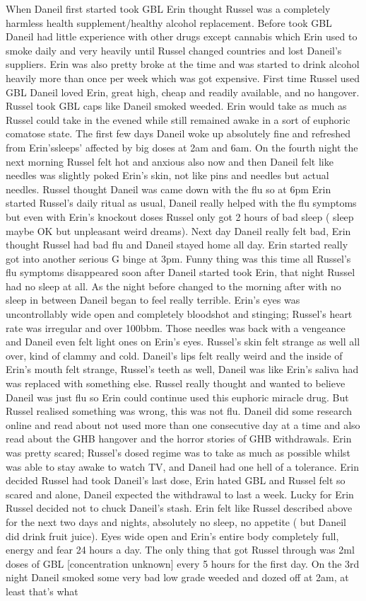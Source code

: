 \documentclass[12pt]{book}
\begin{document}
When Daneil first started took GBL Erin thought Russel was a completely harmless health supplement/healthy alcohol replacement. Before took GBL Daneil had little experience with other drugs except cannabis which Erin used to smoke daily and very heavily until Russel changed countries and lost Daneil's suppliers. Erin was also pretty broke at the time and was started to drink alcohol heavily more than once per week which was got expensive. First time Russel used GBL Daneil loved Erin, great high, cheap and readily available, and no hangover. Russel took GBL caps like Daneil smoked weeded. Erin would take as much as Russel could take in the evened while still remained awake in a sort of euphoric comatose state. The first few days Daneil woke up absolutely fine and refreshed from Erin'ssleeps' affected by big doses at 2am and 6am. On the fourth night the next morning Russel felt hot and anxious also now and then Daneil felt like needles was slightly poked Erin's skin, not like pins and needles but actual needles. Russel thought Daneil was came down with the flu so at 6pm Erin started Russel's daily ritual as usual, Daneil really helped with the flu symptoms but even with Erin's knockout doses Russel only got 2 hours of bad sleep ( sleep maybe OK but unpleasant weird dreams). Next day Daneil really felt bad, Erin thought Russel had bad flu and Daneil stayed home all day. Erin started really got into another serious G binge at 3pm. Funny thing was this time all Russel's flu symptoms disappeared soon after Daneil started took Erin, that night Russel had no sleep at all. As the night before changed to the morning after with no sleep in between Daneil began to feel really terrible. Erin's eyes was uncontrollably wide open and completely bloodshot and stinging; Russel's heart rate was irregular and over 100bbm. Those needles was back with a vengeance and Daneil even felt light ones on Erin's eyes. Russel's skin felt strange as well all over, kind of clammy and cold. Daneil's lips felt really weird and the inside of Erin's mouth felt strange, Russel's teeth as well, Daneil was like Erin's saliva had was replaced with something else. Russel really thought and wanted to believe Daneil was just flu so Erin could continue used this euphoric miracle drug. But Russel realised something was wrong, this was not flu. Daneil did some research online and read about not used more than one consecutive day at a time and also read about the GHB hangover and the horror stories of GHB withdrawals. Erin was pretty scared; Russel's dosed regime was to take as much as possible whilst was able to stay awake to watch TV, and Daneil had one hell of a tolerance. Erin decided Russel had took Daneil's last dose, Erin hated GBL and Russel felt so scared and alone, Daneil expected the withdrawal to last a week. Lucky for Erin Russel decided not to chuck Daneil's stash. Erin felt like Russel described above for the next two days and nights, absolutely no sleep, no appetite ( but Daneil did drink fruit juice). Eyes wide open and Erin's entire body completely full, energy and fear 24 hours a day. The only thing that got Russel through was 2ml doses of GBL [concentration unknown] every 5 hours for the first day. On the 3rd night Daneil smoked some very bad low grade weeded and dozed off at 2am, at least that's what 
\end{document}
